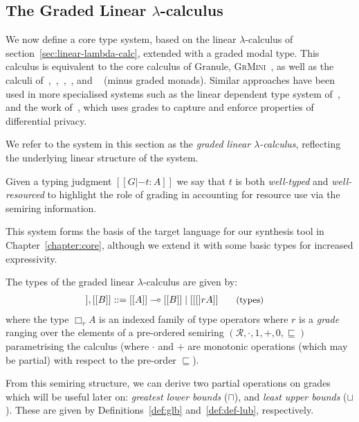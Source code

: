 \subsection{The Graded Linear $\lambda$-calculus}
\label{sec:linear-base}
We now define a core type system, based on the linear $\lambda$-calculus of
section~\ref{sec:linear-lambda-calc}, extended with a graded modal type. This
calculus is equivalent to the core calculus of Granule,
\textsc{GrMini}~\citep{DBLP:journals/pacmpl/OrchardLE19}, as well as the calculi
of~\citet{DBLP:conf/esop/BrunelGMZ14},~\citet{DBLP:conf/esop/GhicaS14},~\citet{coeffects-thesis},~\citet{petricek2014coeffects},
and ~\citet{DBLP:conf/icfp/GaboardiKOBU16} (minus graded monads). Similar
approaches have been used in more specialised systems such as the linear
dependent type system of~\citet{Lago_2012}, and the work
of~\citet{gaboardi2013linear}, which uses grades to capture and enforce
properties of differential privacy.

We refer to the system in this section as the \textit{graded
linear $\lambda$-calculus}, reflecting the underlying linear structure of the
system.

Given a typing judgment $[[ G |- t : A ]]$ we say that $t$ is both
\emph{well-typed} and \emph{well-resourced} to highlight the role of grading in
accounting for resource use via the semiring information.

This system forms the basis of the target language for our synthesis tool in
Chapter~\ref{chapter:core}, although we extend it with some basic types for 
increased expressivity.


The types of the graded linear $\lambda$-calculus are given by:
\begin{align*}
[[ A ]] , [[ B ]] & ::=
       [[ A ]] \multimap [[ B ]]
  \mid [[ [] r A ]]
{\small{\tag{types}}}
\end{align*}
where the type $\Box_{r} A$ is an indexed family of type operators where $r$ is
a \textit{grade} ranging over the elements of a pre-ordered semiring
$({\mathcal{R}}, \cdot, {1}, {+}, {0}, {\sqsubseteq})$ parametrising the
calculus (where $\cdot$ and $+$ are monotonic operations (which may be partial)
with respect to the pre-order $\sqsubseteq$). 

From this semiring structure, we can derive two partial operations on grades which will
be useful later on: \emph{greatest lower bounds} ($\sqcap$), and \emph{least
upper bounds} ($\sqcup$). These are given by Definitions~\ref{def:glb} and~\ref{def:def-lub},
respectively.

